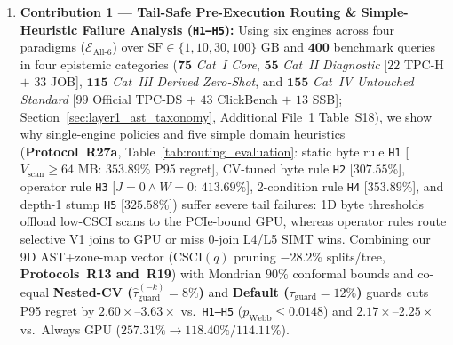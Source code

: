 \documentclass[10pt,a4paper]{article}
\begin{document}
\begin{enumerate}[leftmargin=1.5em,itemsep=1.5pt]
    \item \textbf{Contribution 1 --- Tail-Safe Pre-Execution Routing \& Simple-Heuristic Failure Analysis (\texttt{H1--H5}):} Using six engines across four paradigms ($\mathcal{E}_{\text{All-6}}$) over $\text{SF}\in\{1,10,30,100\}\text{ GB}$ and $\mathbf{400}$ benchmark queries in four epistemic categories ($\mathbf{75}$ \emph{Cat~I Core}, $\mathbf{55}$ \emph{Cat~II Diagnostic} [$22$ TPC-H $+$ $33$ JOB], $\mathbf{115}$ \emph{Cat~III Derived Zero-Shot}, and $\mathbf{155}$ \emph{Cat~IV Untouched Standard} [$99$ Official TPC-DS $+$ $43$ ClickBench $+$ $13$ SSB]; Section~\ref{sec:layer1_ast_taxonomy}, Additional File~1 Table~S18), we show why single-engine policies and five simple domain heuristics (\textbf{Protocol~R27a}, Table~\ref{tab:routing_evaluation}: static byte rule \texttt{H1} [$V_{\text{scan}}\ge 64\text{ MB}$: $353.89\%$ P95 regret], CV-tuned byte rule \texttt{H2} [$307.55\%$], operator rule \texttt{H3} [$J=0\wedge W=0$: $413.69\%$], 2-condition rule \texttt{H4} [$353.89\%$], and depth-1 stump \texttt{H5} [$325.58\%$]) suffer severe tail failures: 1D byte thresholds offload low-CSCI scans to the PCIe-bound GPU, whereas operator rules route selective V1 joins to GPU or miss 0-join L4/L5 SIMT wins. Combining our 9D AST+zone-map vector ($\text{CSCI}(q)$ pruning $-28.2\%$ splits/tree, \textbf{Protocols~R13 and~R19}) with Mondrian $90\%$ conformal bounds and co-equal \textbf{Nested-CV ($\hat{\tau}_{\text{guard}}^{(-k)}=8\%$)} and \textbf{Default ($\tau_{\text{guard}}=12\%$)} guards cuts P95 regret by $\mathbf{2.60\times\text{--}3.63\times}$ vs.\ \texttt{H1--H5} ($p_{\text{Webb}}\le 0.0148$) and $\mathbf{2.17\times\text{--}2.25\times}$ vs.\ Always GPU ($257.31\%\rightarrow \mathbf{118.40\% / 114.11\%}$).

\end{enumerate}
\end{document}
